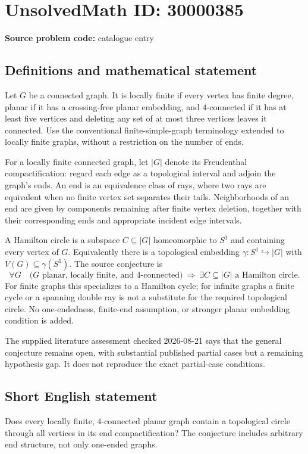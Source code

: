 \documentclass[11pt]{article}
\begin{document}
\section*{UnsolvedMath ID: 30000385}
\textbf{Source problem code:} catalogue entry
\subsection{Definitions and mathematical statement}
Let \(G\) be a connected graph. It is locally finite if every vertex has finite degree, planar if it has a crossing-free planar embedding, and \(4\)-connected if it has at least five vertices and deleting any set of at most three vertices leaves it connected. Use the conventional finite-simple-graph terminology extended to locally finite graphs, without a restriction on the number of ends.

For a locally finite connected graph, let \(|G|\) denote its Freudenthal compactification: regard each edge as a topological interval and adjoin the graph's ends. An end is an equivalence class of rays, where two rays are equivalent when no finite vertex set separates their tails. Neighborhoods of an end are given by components remaining after finite vertex deletion, together with their corresponding ends and appropriate incident edge intervals.

A Hamilton circle is a subspace \(C\subseteq|G|\) homeomorphic to \(S^1\) and containing every vertex of \(G\). Equivalently there is a topological embedding \(\gamma:S^1\hookrightarrow|G|\) with \(V(G)\subseteq\gamma(S^1)\). The source conjecture is
\[
\forall G\quad
\bigl(G\text{ planar, locally finite, and }4\text{-connected}\bigr)
\ \Longrightarrow\ 
\exists C\subseteq|G|\text{ a Hamilton circle}.
\]
For finite graphs this specializes to a Hamilton cycle; for infinite graphs a finite cycle or a spanning double ray is not a substitute for the required topological circle. No one-endedness, finite-end assumption, or stronger planar embedding condition is added.

The supplied literature assessment checked 2026-08-21 says that the general conjecture remains open, with substantial published partial cases but a remaining hypothesis gap. It does not reproduce the exact partial-case conditions.
\subsection{Short English statement}
Does every locally finite, \(4\)-connected planar graph contain a topological circle through all vertices in its end compactification? The conjecture includes arbitrary end structure, not only one-ended graphs.
\end{document}
